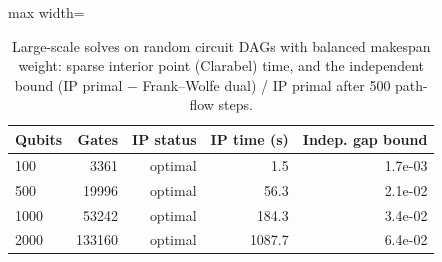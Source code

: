 \begin{table}[t]
\centering
\caption{Large-scale solves on random circuit DAGs with balanced makespan weight: sparse interior point (Clarabel) time, and the independent bound (IP primal $-$ Frank--Wolfe dual) / IP primal after 500 path-flow steps.}\label{tab:c8}
\footnotesize
\begin{adjustbox}{max width=\columnwidth}
\begin{tabular}{lrrrr}
\toprule
Qubits & Gates & IP status & IP time (s) & Indep. gap bound \\
\midrule
100 & 3361 & optimal & 1.5 & 1.7e-03 \\
500 & 19996 & optimal & 56.3 & 2.1e-02 \\
1000 & 53242 & optimal & 184.3 & 3.4e-02 \\
2000 & 133160 & optimal & 1087.7 & 6.4e-02 \\
\bottomrule
\end{tabular}
\end{adjustbox}
\end{table}
